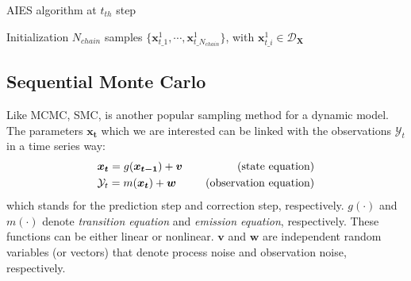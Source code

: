 \begin{algorithm}    
    \caption{\acrlong{AIES} algorithm at $t_{th}$ step}
    \label{Algorithm:AIES}
    Initialization $N_{chain}$ samples $\{  \boldsymbol{x}_{t\_1}^{1},\cdots,\boldsymbol{x}_{t\_{N_{chain}}}^{1}\}$, with $\boldsymbol{x}_{t\_i}^{1} \in \mathcal{D}_{\boldsymbol{X}}$\
    
\end{algorithm}



\subsection{Sequential Monte Carlo}

Like \acrshort{MCMC}, \acrfull{SMC}, is another popular sampling method for a dynamic model. The parameters $\boldsymbol{{x}_{t}}$ which we are interested can be linked with the observations $\mathcal{Y}_{t}$ in a time series way:
\begin{equation}
\label{eq: Bayesian filtering}
\begin{aligned}
   & \boldsymbol{{x}_{t}}  =g(\boldsymbol{{x}_{t-1}}) + \boldsymbol{v} \ \   \ &\rm{(state  \ equation)}\\    
     &\mathcal{Y}_{t}=m(\boldsymbol{{x}_{t}}) + \boldsymbol{w} \ \ \ \ \ &\rm{(observation \  equation)}
\end{aligned}
\end{equation}
which stands for the prediction step and correction step, respectively.
$g(\cdot)$ and $m(\cdot)$ denote \textit{transition equation} and \textit{emission equation}, respectively. These functions can be either linear or nonlinear. $\boldsymbol{v}$ and $\boldsymbol{w}$ are independent random variables (or vectors) that denote process noise and observation noise, respectively.


